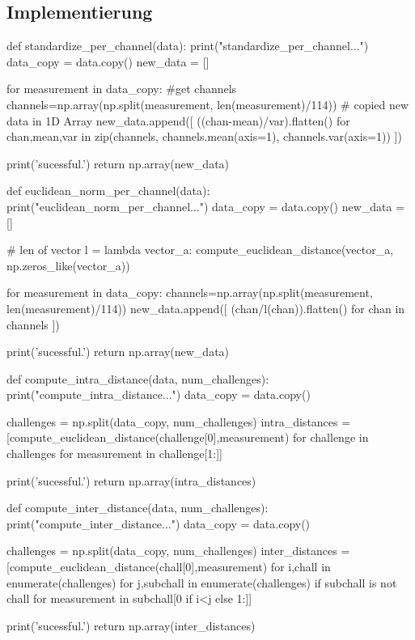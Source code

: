 \subsection{Implementierung}
\begin{python}
def standardize_per_channel(data):
	print("standardize_per_channel...")
	data_copy = data.copy()
	new_data = []
	
	for measurement in data_copy: 
		#get channels
		channels=np.array(np.split(measurement, len(measurement)/114)) 
		# copied new data in 1D Array
		new_data.append([ ((chan-mean)/var).flatten() for chan,mean,var in zip(channels, channels.mean(axis=1), channels.var(axis=1)) ])
    
	print('sucessful.')
	return np.array(new_data)
\end{python}

\begin{python}
def euclidean_norm_per_channel(data):
	print("euclidean_norm_per_channel...")
	data_copy = data.copy()
	new_data = []
	
	# len of vector
	l = lambda vector_a: compute_euclidean_distance(vector_a, np.zeros_like(vector_a))
	
	for measurement in data_copy: 
		channels=np.array(np.split(measurement, len(measurement)/114))
		new_data.append([ (chan/l(chan)).flatten() for chan in channels ])


	print('sucessful.')
	return np.array(new_data)
\end{python}
\newpage
\begin{python}    
def compute_intra_distance(data, num_challenges):
	print("compute_intra_distance...")
	data_copy = data.copy()

	challenges = np.split(data_copy, num_challenges)
	intra_distances = [compute_euclidean_distance(challenge[0],measurement) 
                       for challenge in challenges
                       for measurement in challenge[1:]]
    
	print('sucessful.')
	return np.array(intra_distances)
\end{python}

\begin{python}
def compute_inter_distance(data, num_challenges):
	print("compute_inter_distance...")
	data_copy = data.copy()

	challenges = np.split(data_copy, num_challenges)
	inter_distances = [compute_euclidean_distance(chall[0],measurement)
                       for i,chall in enumerate(challenges)
                       for j,subchall in enumerate(challenges)
                       if subchall is not chall
                       for measurement in subchall[0 if i<j else 1:]]

	print('sucessful.')
	return np.array(inter_distances)
\end{python}